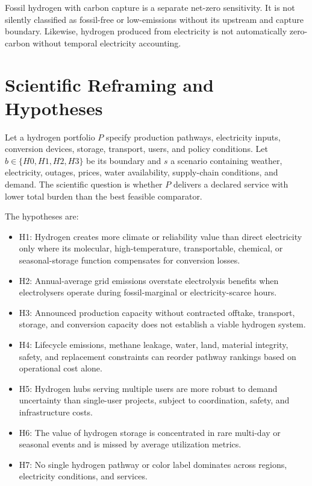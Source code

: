 \documentclass[conference]{IEEEtran}
\begin{document}
Fossil hydrogen with carbon capture is a separate net-zero sensitivity. It is not silently classified as fossil-free or low-emissions without its upstream and capture boundary. Likewise, hydrogen produced from electricity is not automatically zero-carbon without temporal electricity accounting.

\section{Scientific Reframing and Hypotheses}
\label{sec:hyp}
Let a hydrogen portfolio $P$ specify production pathways, electricity inputs, conversion devices, storage, transport, users, and policy conditions. Let $b\in\{H0,H1,H2,H3\}$ be its boundary and $s$ a scenario containing weather, electricity, outages, prices, water availability, supply-chain conditions, and demand. The scientific question is whether $P$ delivers a declared service with lower total burden than the best feasible comparator.

The hypotheses are:
\begin{itemize}
\item H1: Hydrogen creates more climate or reliability value than direct electricity only where its molecular, high-temperature, transportable, chemical, or seasonal-storage function compensates for conversion losses.
\item H2: Annual-average grid emissions overstate electrolysis benefits when electrolysers operate during fossil-marginal or electricity-scarce hours.
\item H3: Announced production capacity without contracted offtake, transport, storage, and conversion capacity does not establish a viable hydrogen system.
\item H4: Lifecycle emissions, methane leakage, water, land, material integrity, safety, and replacement constraints can reorder pathway rankings based on operational cost alone.
\item H5: Hydrogen hubs serving multiple users are more robust to demand uncertainty than single-user projects, subject to coordination, safety, and infrastructure costs.
\item H6: The value of hydrogen storage is concentrated in rare multi-day or seasonal events and is missed by average utilization metrics.
\item H7: No single hydrogen pathway or color label dominates across regions, electricity conditions, and services.
\end{itemize}
\end{document}

